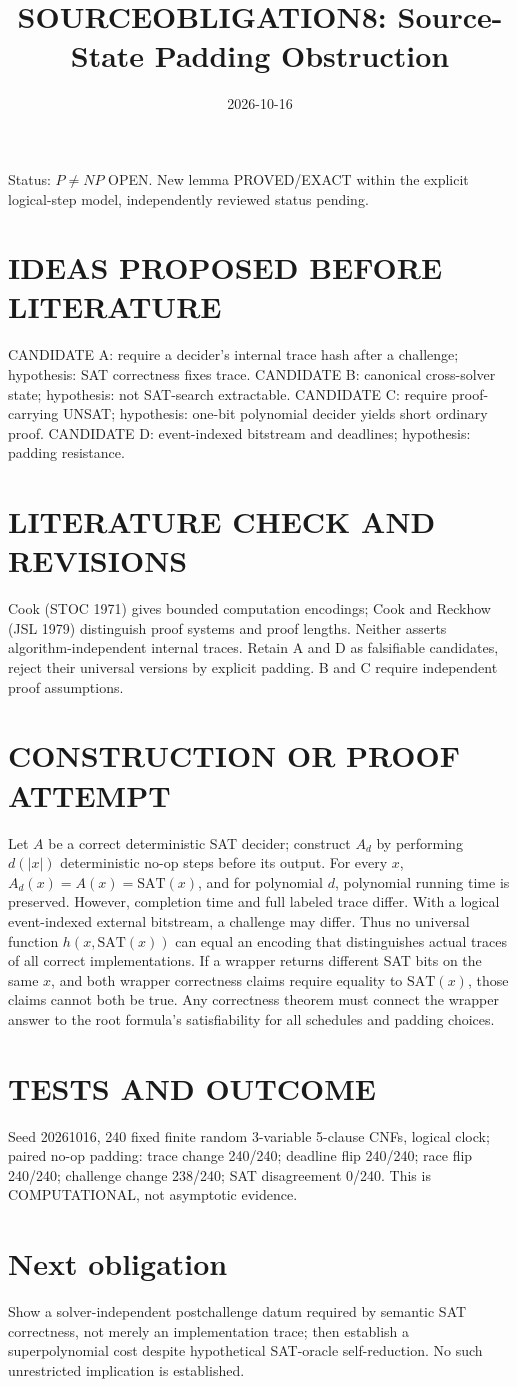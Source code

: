 \documentclass{article}
\title{SOURCEOBLIGATION8: Source-State Padding Obstruction}
\date{2026-10-16}
\begin{document}
\maketitle
\noindent Status: $P\ne NP$ OPEN. New lemma PROVED/EXACT within the explicit logical-step model, independently reviewed status pending.
\section{IDEAS PROPOSED BEFORE LITERATURE}
CANDIDATE A: require a decider's internal trace hash after a challenge; hypothesis: SAT correctness fixes trace. CANDIDATE B: canonical cross-solver state; hypothesis: not SAT-search extractable. CANDIDATE C: require proof-carrying UNSAT; hypothesis: one-bit polynomial decider yields short ordinary proof. CANDIDATE D: event-indexed bitstream and deadlines; hypothesis: padding resistance.
\section{LITERATURE CHECK AND REVISIONS}
Cook (STOC 1971) gives bounded computation encodings; Cook and Reckhow (JSL 1979) distinguish proof systems and proof lengths. Neither asserts algorithm-independent internal traces. Retain A and D as falsifiable candidates, reject their universal versions by explicit padding. B and C require independent proof assumptions.
\section{CONSTRUCTION OR PROOF ATTEMPT}
Let $A$ be a correct deterministic SAT decider; construct $A_d$ by performing $d(|x|)$ deterministic no-op steps before its output. For every $x$, $A_d(x)=A(x)=\mathrm{SAT}(x)$, and for polynomial $d$, polynomial running time is preserved. However, completion time and full labeled trace differ. With a logical event-indexed external bitstream, a challenge may differ. Thus no universal function $h(x,\mathrm{SAT}(x))$ can equal an encoding that distinguishes actual traces of all correct implementations. If a wrapper returns different SAT bits on the same $x$, and both wrapper correctness claims require equality to $\mathrm{SAT}(x)$, those claims cannot both be true. Any correctness theorem must connect the wrapper answer to the root formula's satisfiability for all schedules and padding choices.
\section{TESTS AND OUTCOME}
Seed 20261016, 240 fixed finite random 3-variable 5-clause CNFs, logical clock; paired no-op padding: trace change 240/240; deadline flip 240/240; race flip 240/240; challenge change 238/240; SAT disagreement 0/240. This is COMPUTATIONAL, not asymptotic evidence.
\section{Next obligation}
Show a solver-independent postchallenge datum required by semantic SAT correctness, not merely an implementation trace; then establish a superpolynomial cost despite hypothetical SAT-oracle self-reduction. No such unrestricted implication is established.
\end{document}
